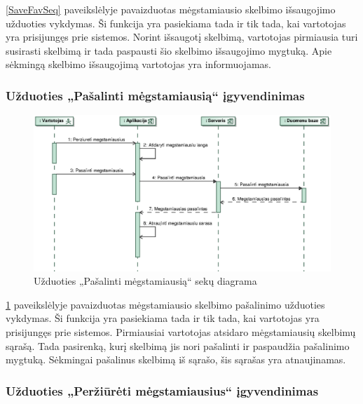 \documentclass[12pt]{article}
\begin{document}
	\ref{SaveFavSeq} paveikslėlyje pavaizduotas mėgstamiausio skelbimo išsaugojimo užduoties vykdymas. Ši funkcija yra pasiekiama tada ir tik tada, kai vartotojas yra prisijungęs prie sistemos. Norint išsaugotį skelbimą, vartotojas pirmiausia turi susirasti skelbimą ir tada  paspausti šio skelbimo išsaugojimo mygtuką. Apie sėkmingą skelbimo išsaugojimą vartotojas yra informuojamas.
	\pagebreak
	
	\subsubsection{Užduoties „Pašalinti mėgstamiausią“ įgyvendinimas}
	
	\begin{figure}[h]
		\begin{center}
			\includegraphics[width=\textwidth]{PasalintiMegstamiausia.eps}
			\caption{Užduoties „Pašalinti mėgstamiausią“ sekų diagrama\label{DelFavSeq}}
		\end{center}
	\end{figure}
	
	\ref{DelFavSeq} paveikslėlyje pavaizduotas mėgstamiausio skelbimo pašalinimo užduoties vykdymas. Ši funkcija yra pasiekiama tada ir tik tada, kai vartotojas yra prisijungęs prie sistemos. Pirmiausiai vartotojas atsidaro mėgstamiausių skelbimų sąrašą. Tada pasirenką, kurį skelbimą jis nori pašalinti ir paspaudžia pašalinimo mygtuką. Sėkmingai pašalinus skelbimą iš sąrašo, šis sąrašas yra atnaujinamas.
	\pagebreak
	
	\subsubsection{Užduoties „Peržiūrėti mėgstamiausius“ įgyvendinimas}
	
\end{document}
